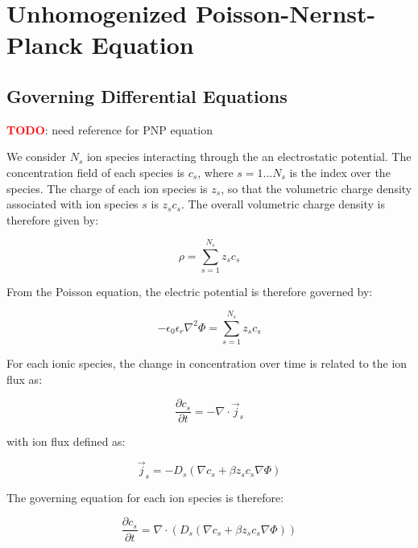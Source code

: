 
\section{Unhomogenized Poisson-Nernst-Planck Equation}\label{sec:unhom_pnp}

\subsection{Governing Differential Equations}\label{subsec:unhom_pnp_gov}


\textcolor{red}{\textbf{TODO}}: need reference for PNP equation

We consider $N_s$ ion species interacting through the an electrostatic potential.
The concentration field of each species is $c_s$, where $s=1 ... N_s$ is the index over the species.
The charge of each ion species is $z_s$, so that the volumetric charge density associated
with ion species $s$ is $z_s c_s$.
The overall volumetric charge density is therefore given by:

\begin{equation}
\rho = \sum_{s=1}^{N_s}z_s c_s
\end{equation}

From the Poisson equation, the electric potential is therefore governed by:

\begin{equation}\label{eq:Poisson_for_ions}
-\epsilon_{0}\epsilon_{r} \nabla^2 \Phi = \sum_{s=1}^{N_s}z_s c_s
\end{equation}

For each ionic species, the change in concentration over time is related to the ion flux as:

\begin{equation} 
\frac{\partial c_s}{\partial t} = - \nabla \cdot \vec{j}_s
\end{equation} 

with ion flux defined as:

\begin{equation}
\vec{j}_s  = -D_s \left( \nabla c_s + \beta z_s c_s \nabla \Phi \right)
\end{equation}

The governing equation for each ion species is therefore:

\begin{equation}
\frac{\partial c_s}{\partial t} = \nabla \cdot \left(
D_s \left( \nabla c_s + \beta z_s c_s \nabla \Phi \right)
\right)
\end{equation}

